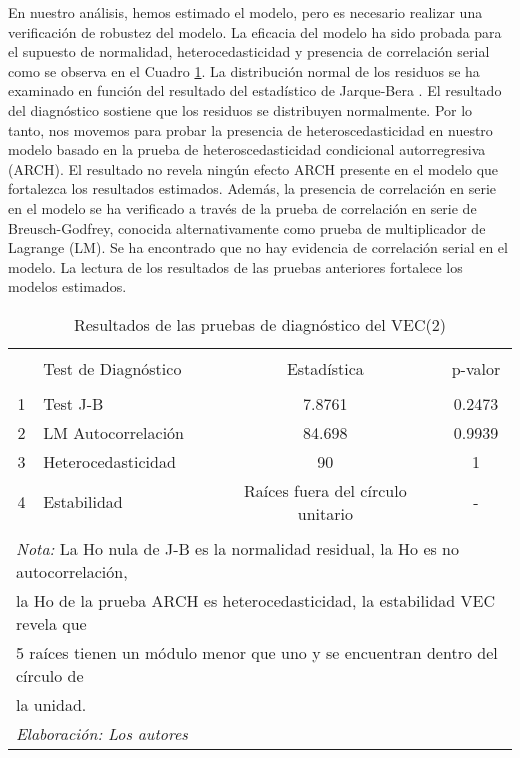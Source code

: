 \documentclass[11pt,]{article}
\begin{document}
En nuestro análisis, hemos estimado el modelo, pero es necesario
realizar una verificación de robustez del modelo. La eficacia del modelo
ha sido probada para el supuesto de normalidad, heterocedasticidad y
presencia de correlación serial como se observa en el Cuadro
\ref{tab:tb5}. La distribución normal de los residuos se ha examinado en
función del resultado del estadístico de Jarque-Bera . El resultado del
diagnóstico sostiene que los residuos se distribuyen normalmente. Por lo
tanto, nos movemos para probar la presencia de heteroscedasticidad en
nuestro modelo basado en la prueba de heteroscedasticidad condicional
autorregresiva (ARCH). El resultado no revela ningún efecto ARCH
presente en el modelo que fortalezca los resultados estimados. Además,
la presencia de correlación en serie en el modelo se ha verificado a
través de la prueba de correlación en serie de Breusch-Godfrey, conocida
alternativamente como prueba de multiplicador de Lagrange (LM). Se ha
encontrado que no hay evidencia de correlación serial en el modelo. La
lectura de los resultados de las pruebas anteriores fortalece los
modelos estimados.

\begin{table}[!htbp] \centering 
  \caption{Resultados de las pruebas de diagnóstico del VEC(2)} 
  \label{tab:tb5} 
\small 
\begin{tabular}{@{\extracolsep{5pt}} clcc} 
\\[-1.8ex]\hline 
\hline \\[-1.8ex] 
 & Test de Diagnóstico & Estadística & p-valor \\ 
\hline \\[-1.8ex] 
1 & Test J-B & 7.8761 & 0.2473 \\ 
2 & LM Autocorrelación & 84.698 & 0.9939 \\ 
3 & Heterocedasticidad & 90 & 1 \\ 
4 & Estabilidad & Raíces fuera del círculo unitario & - \\ 
\hline \\[-1.8ex] 
\multicolumn{4}{l}{\footnotesize{\textit{Nota:} La Ho nula de J-B es la normalidad residual, la Ho es no autocorrelación, }} \\ 
\multicolumn{4}{l}{ \footnotesize{ la Ho de la prueba ARCH es heterocedasticidad, la estabilidad VEC revela que}} \\ 
\multicolumn{4}{l}{ \footnotesize{  5 raíces tienen un módulo menor que uno y se encuentran dentro del círculo de }} \\ 
\multicolumn{4}{l}{\footnotesize{la unidad. }} \\ 
\multicolumn{4}{l}{\footnotesize{\textit{Elaboración: Los autores}}} \\ 
\end{tabular} 
\end{table}
\end{document}
